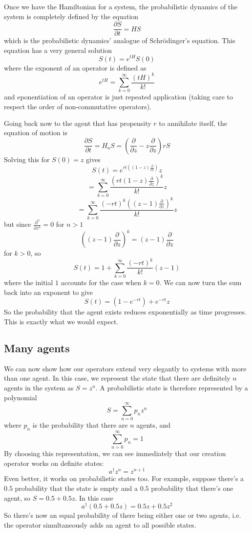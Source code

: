 \documentclass[letterpaper,twocolumn,10pt]{article}
\begin{document}
Once we have the Hamiltonian for a system, the probabilistic dynamics of the system is completely defined by the equation
\[
\frac{\partial S}{\partial t} = HS
\]
which is the probabilistic dynamics' analogue of Schr\"{o}dinger's equation. This equation has a very general solution
\[
S(t) = e^{tH}S(0)
\]
where the exponent of an operator is defined as
\[
e^{tH} = \sum_{k=0}^\infty \frac{(tH)^k}{k!}
\]
and eponentiation of an operator is just repeated application (taking care to respect the order of non-commutative operators).

Going back now to the agent that has propensity $r$ to annihilate itself, the equation of motion is
\[
\frac{\partial S}{\partial t} = H_aS = \left(\frac{\partial }{\partial z} - z\frac{\partial }{\partial z}\right)rS
\]
Solving this for $S(0) = z$ gives
\[
S(t) = e^{rt((1-z)\frac{\partial}{\partial z})}z
\]
\[
 = \sum_{k=0}^\infty \frac{\left(rt(1-z)\frac{\partial}{\partial z}\right)^k}{k!}z
\]
\[
= \sum_{k=0}^\infty \frac{(-rt)^k\left((z-1)\frac{\partial}{\partial z}\right)^k}{k!}z
\]
but since $\frac{\partial^n}{\partial z^n} = 0$ for $n>1$
\[
\left((z-1)\frac{\partial}{\partial z}\right)^k = (z-1)\frac{\partial}{\partial z}
\]
for $k>0$, so
\[
S(t) = 1 + \sum_{k=0}^\infty \frac{(-rt)^k}{k!}(z-1)
\]
where the initial $1$ accounts for the case when $k=0$. We can now turn the sum back into an exponent to give
\[
S(t) = (1 - e^{-rt}) + e^{-rt}z
\]
So the probability that the agent exists reduces exponentially as time progresses. This is exactly what we would expect.

\subsection{Many agents}

We can now show how our operators extend very elegantly to systems with more than one agent. In this case, we represent the state that there are definitely $n$ agents in the system as $S = z^n$. A probabilistic state is therefore represented by a polynomial
\[
S = \sum_{n=0}^\infty p_n z^n
\]
where $p_n$ is the probability that there are $n$ agents, and
\[
\sum_{n=0}^\infty p_n = 1
\]
By choosing this representation, we can see immediately that our creation operator works on definite states:
\[
a^\dag z^n = z^{n+1}
\]
Even better, it works on probabilistic states too. For example, suppose there's a $0.5$ probability that the state is empty and a $0.5$ probability that there's one agent, so $S = 0.5 + 0.5z$. In this case
\[
a^\dag (0.5 + 0.5z) = 0.5z + 0.5z^2
\]
So there's now an equal probability of there being either one or two agents, i.e. the operator simultaneously adds an agent to all possible states.
\end{document}
